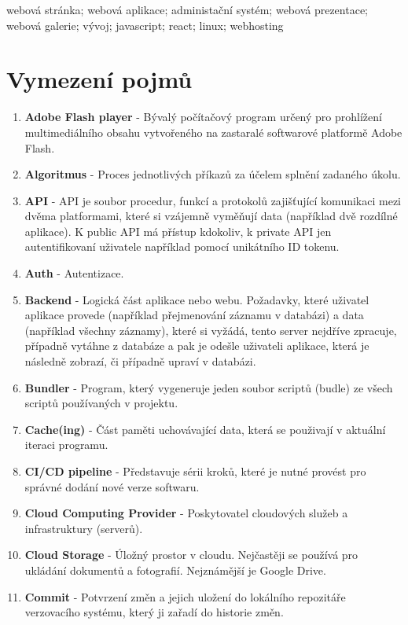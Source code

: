 \documentclass[12pt,a4paper]{report}
\begin{document}
  \noindent webová stránka; webová aplikace; administační systém; webová prezentace; webová galerie; vývoj; javascript; react; linux; webhosting
  
  \clearpage
  
  \tableofcontents
  
  \clearpage

  \chapter{Vymezení pojmů}
  \begin{enumerate}
    \item \textbf{Adobe Flash player} - Bývalý počítačový program určený pro prohlížení multimediálního obsahu vytvořeného na zastaralé softwarové platformě Adobe Flash.
    \item \textbf{Algoritmus} - Proces jednotlivých příkazů za účelem splnění zadaného úkolu.
    \item \textbf{API} - API je soubor procedur, funkcí a protokolů zajišťující komunikaci mezi dvěma platformami, které si vzájemně vyměňují data (například dvě rozdílné aplikace). K public API má přístup kdokoliv, k private API jen autentifikovaní uživatele například pomocí unikátního ID tokenu.
    \item \textbf{Auth} - Autentizace.
    \item \textbf{Backend} -  Logická část aplikace nebo webu. Požadavky, které uživatel aplikace provede (například přejmenování záznamu v databázi) a data (například všechny záznamy), které si vyžádá, tento server nejdříve zpracuje, případně vytáhne z databáze a pak je odešle uživateli aplikace, která je následně zobrazí, či případně upraví v databázi.
    \item \textbf{Bundler} - Program, který vygeneruje jeden soubor scriptů (budle) ze všech scriptů používaných v projektu. 
    \item \textbf{Cache(ing)} - Část paměti uchovávající data, která se použivají v aktuální iteraci programu.
    \item \textbf{CI/CD pipeline} - Představuje sérii kroků, které je nutné provést pro správné dodání nové verze softwaru.
    \item \textbf{Cloud Computing Provider} - Poskytovatel cloudových služeb a infrastruktury (serverů).
    \item \textbf{Cloud Storage} - Úložný prostor v cloudu. Nejčastěji se používá pro ukládání dokumentů a fotografií. Nejznámější je Google Drive.
    \item \textbf{Commit} - Potvrzení změn a jejich uložení do lokálního repozitáře verzovacího systému, který ji zařadí do historie změn.

\end{enumerate}
\end{document}
